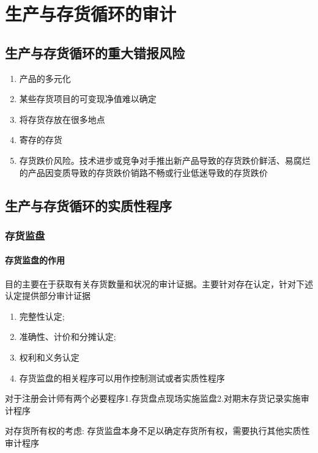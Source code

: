 \documentclass[UTF8,12pt]{ctexart}
\numberwithin{equation}{section} %
\numberwithin{figure}{section}
\numberwithin{table}{section}
\begin{document}
	
	\newpage
	\section{生产与存货循环的审计}
	
	\subsection{生产与存货循环的重大错报风险}
	\begin{enumerate}
		\item 产品的多元化 
		
		\item 某些存货项目的可变现净值难以确定
		
		\item 将存货存放在很多地点 
		
		\item 寄存的存货
		
		\item 存货跌价风险。技术进步或竞争对手推出新产品导致的存货跌价鲜活、易腐烂的产品因变质导致的存货跌价销路不畅或行业低迷导致的存货跌价
	\end{enumerate}
	
	
	\subsection{生产与存货循环的实质性程序}
	\subsubsection{存货监盘}
	\paragraph{存货监盘的作用}
	目的主要在于获取有关存货数量和状况的审计证据。主要针对存在认定，针对下述认定提供部分审计证据
	\begin{enumerate}
		\item 完整性认定;
		
		\item 准确性、计价和分摊认定;
		
		\item 权利和义务认定
		
		\item 存货监盘的相关程序可以用作控制测试或者实质性程序
	\end{enumerate}
	
	对于注册会计师有两个必要程序1.存货盘点现场实施监盘2.对期末存货记录实施审计程序
	
	对存货所有权的考虑: 存货监盘本身不足以确定存货所有权，需要执行其他实质性审计程序
	
\end{document}
